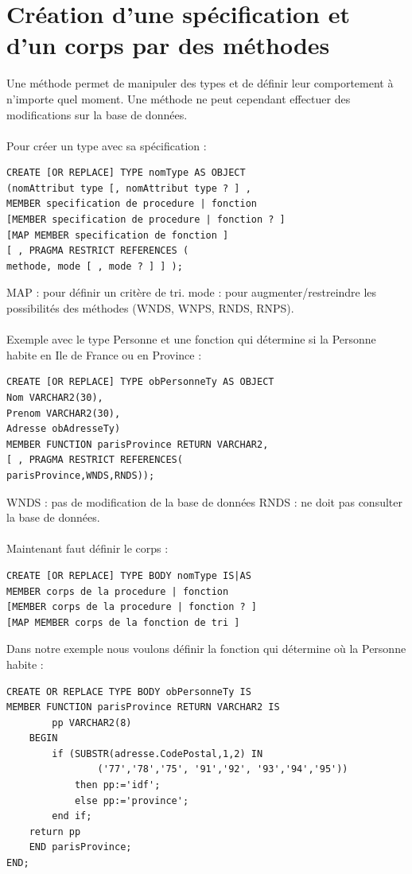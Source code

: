\documentclass{report}
\begin{document}
\section{Création d'une spécification et d'un corps par des méthodes}
Une méthode permet de manipuler des types et de définir leur comportement à n'importe quel moment. Une méthode ne peut cependant effectuer des modifications sur la base de données.\\ \\

Pour créer un type avec sa spécification :
\begin{lstlisting}[style=MySQLStyle]
CREATE [OR REPLACE] TYPE nomType AS OBJECT
(nomAttribut type [, nomAttribut type ? ] ,
MEMBER specification de procedure | fonction
[MEMBER specification de procedure | fonction ? ]
[MAP MEMBER specification de fonction ]
[ , PRAGMA RESTRICT REFERENCES (
methode, mode [ , mode ? ] ] );
\end{lstlisting}
MAP : pour définir un critère de tri.
mode : pour augmenter/restreindre les possibilités des méthodes
(WNDS, WNPS, RNDS, RNPS).\\ \\

Exemple avec le type Personne et une fonction qui détermine si la Personne habite en Ile de France ou en Province :
\begin{lstlisting}[style=MySQLStyle]
CREATE [OR REPLACE] TYPE obPersonneTy AS OBJECT
Nom VARCHAR2(30),
Prenom VARCHAR2(30),
Adresse obAdresseTy)
MEMBER FUNCTION parisProvince RETURN VARCHAR2,
[ , PRAGMA RESTRICT REFERENCES(
parisProvince,WNDS,RNDS));
\end{lstlisting}
WNDS : pas de modification de la base de données
RNDS : ne doit pas consulter la base de données. \\ \\

Maintenant faut définir le corps :
\begin{lstlisting}[style=MySQLStyle]
CREATE [OR REPLACE] TYPE BODY nomType IS|AS
MEMBER corps de la procedure | fonction
[MEMBER corps de la procedure | fonction ? ]
[MAP MEMBER corps de la fonction de tri ]
\end{lstlisting}

Dans notre exemple nous voulons définir la fonction qui détermine où la Personne habite :
\begin{lstlisting}[style=MySQLStyle]
CREATE OR REPLACE TYPE BODY obPersonneTy IS
MEMBER FUNCTION parisProvince RETURN VARCHAR2 IS
		pp VARCHAR2(8)
	BEGIN
		if (SUBSTR(adresse.CodePostal,1,2) IN
				('77','78','75', '91','92', '93','94','95'))
			then pp:='idf';
			else pp:='province';
		end if;
	return pp
	END parisProvince;
END;
\end{lstlisting}
\end{document}
